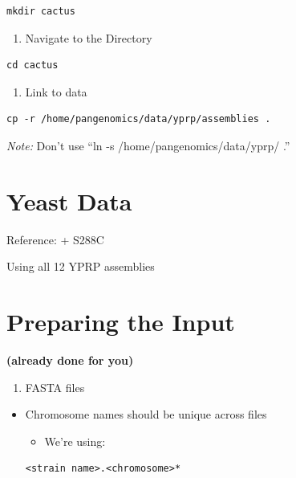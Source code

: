 \documentclass[
]{book}
\providecommand{\tightlist}{%
  \setlength{\itemsep}{0pt}\setlength{\parskip}{0pt}}
\begin{document}
\begin{verbatim}
mkdir cactus
\end{verbatim}

\begin{enumerate}
\def\labelenumi{\arabic{enumi}.}
\setcounter{enumi}{2}
\tightlist
\item
  Navigate to the Directory
\end{enumerate}

\begin{verbatim}
cd cactus
\end{verbatim}

\begin{enumerate}
\def\labelenumi{\arabic{enumi}.}
\setcounter{enumi}{3}
\tightlist
\item
  Link to data
\end{enumerate}

\begin{verbatim}
cp -r /home/pangenomics/data/yprp/assemblies .
\end{verbatim}

\emph{Note:} Don't use ``ln -s /home/pangenomics/data/yprp/ .''

\hypertarget{yeast-data-1}{%
\section{Yeast Data}\label{yeast-data-1}}

Reference:
+ S288C

Using all 12 YPRP assemblies

\hypertarget{preparing-the-input-1}{%
\section{Preparing the Input}\label{preparing-the-input-1}}

\textbf{(already done for you)}

\begin{enumerate}
\def\labelenumi{\arabic{enumi}.}
\tightlist
\item
  FASTA files
\end{enumerate}

\begin{itemize}
\tightlist
\item
  Chromosome names should be unique across files

  \begin{itemize}
  \tightlist
  \item
    We're using:
  \end{itemize}

\begin{verbatim}
<strain name>.<chromosome>*
\end{verbatim}
\end{itemize}
\end{document}
